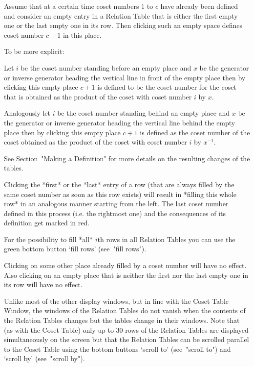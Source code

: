 Assume that at a certain time coset numbers 1 to $c$ have already been
defined and consider an empty entry in a Relation Table that is either
the first empty one or the last empty one in its row. Then clicking
such an empty space defines coset number $c+1$ in this place.

To be more explicit:

Let $i$ be the coset number standing before an empty place and $x$ be
the generator or inverse generator heading the vertical line in front
of the empty place then by clicking this empty place $c+1$ is defined
to be the coset number for the coset that is obtained as the product
of the coset with coset number $i$ by $x$.

Analogously let $i$ be the coset number standing behind an empty place
and $x$ be the generator or inverse generator heading the vertical
line behind the empty place then by clicking this empty place $c+1$ is
defined as the coset number of the coset obtained as the product of
the coset with coset number $i$ by $x^{-1}$.

See Section~"Making a Definition" for more details on the resulting
changes of the tables.

Clicking the *first* or the *last* entry of a row (that are always
filled by the same coset number as soon as this row exists) will
result in *filling this whole row* in an analogous manner starting
from the left. The last coset number defined in this process
(i.e. the rightmost one) and the consequences of its definition get
marked in red.

For the possibility to fill *all* $i$th rows in all Relation Tables
you can use the green bottom button `fill rows' (see~"fill rows").

Clicking on some other place already filled by a coset number will
have no effect. Also clicking on an empty place that is neither the
first nor the last empty one in its row will have no effect.

Unlike most of the other display windows, but in line with the Coset
Table Window, the windows of the Relation Tables do not vanish when the
contents of the Relation Tables changes
but the tables change in their windows.
Note that (as with the Coset Table) only up to 30 rows of the
Relation Tables are displayed simultaneously on the screen
but that the Relation Tables can be scrolled parallel to the Coset Table
using the bottom buttons `scroll to' (see~"scroll to") and `scroll by'
(see~"scroll by").



